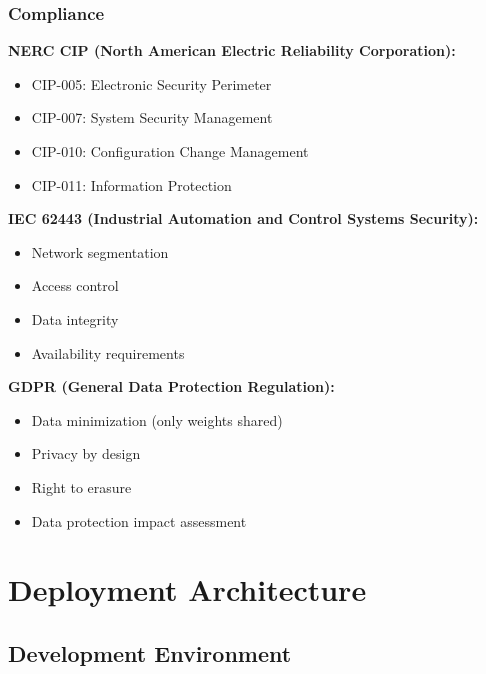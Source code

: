 \documentclass[12pt,a4paper]{article}
\begin{document}
\subsubsection{Compliance}

\textbf{NERC CIP (North American Electric Reliability Corporation):}
\begin{itemize}[leftmargin=1cm,itemsep=0pt]
    \item CIP-005: Electronic Security Perimeter
    \item CIP-007: System Security Management
    \item CIP-010: Configuration Change Management
    \item CIP-011: Information Protection
\end{itemize}

\textbf{IEC 62443 (Industrial Automation and Control Systems Security):}
\begin{itemize}[leftmargin=1cm,itemsep=0pt]
    \item Network segmentation
    \item Access control
    \item Data integrity
    \item Availability requirements
\end{itemize}

\textbf{GDPR (General Data Protection Regulation):}
\begin{itemize}[leftmargin=1cm,itemsep=0pt]
    \item Data minimization (only weights shared)
    \item Privacy by design
    \item Right to erasure
    \item Data protection impact assessment
\end{itemize}

\section{Deployment Architecture}

\subsection{Development Environment}
\end{document}
